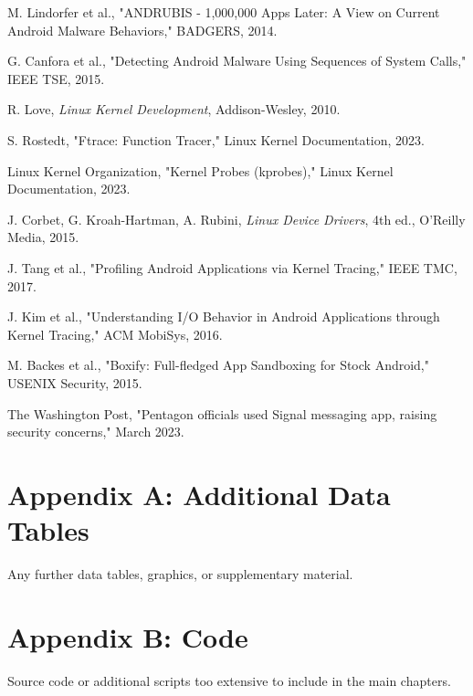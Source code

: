 \documentclass[a4paper,12pt]{report}
\begin{document}
\begin{thebibliography}{99}
     M. Lindorfer et al., "ANDRUBIS - 1,000,000 Apps Later: A View on Current Android Malware Behaviors," BADGERS, 2014.

     G. Canfora et al., "Detecting Android Malware Using Sequences of System Calls," IEEE TSE, 2015.

     R. Love, \textit{Linux Kernel Development}, Addison-Wesley, 2010.

     S. Rostedt, "Ftrace: Function Tracer," Linux Kernel Documentation, 2023.

     Linux Kernel Organization, "Kernel Probes (kprobes)," Linux Kernel Documentation, 2023.

     J. Corbet, G. Kroah-Hartman, A. Rubini, \textit{Linux Device Drivers}, 4th ed., O'Reilly Media, 2015.

     J. Tang et al., "Profiling Android Applications via Kernel Tracing," IEEE TMC, 2017.

     J. Kim et al., "Understanding I/O Behavior in Android Applications through Kernel Tracing," ACM MobiSys, 2016.

     M. Backes et al., "Boxify: Full-fledged App Sandboxing for Stock Android," USENIX Security, 2015.

     The Washington Post, "Pentagon officials used Signal messaging app, raising security concerns," March 2023.
    \end{thebibliography}
\clearpage

\appendix

\chapter{Appendix A: Additional Data Tables}
Any further data tables, graphics, or supplementary material.

\chapter{Appendix B: Code}
Source code or additional scripts too extensive to include in the main chapters.
\end{document}
